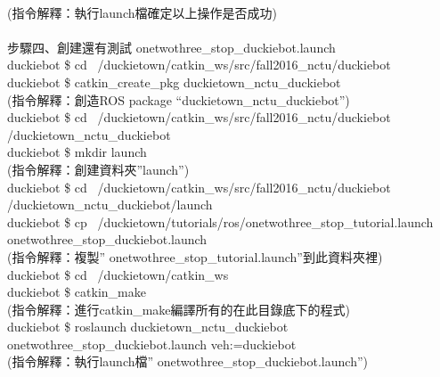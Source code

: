 \documentclass{article}
\begin{document}
\\(指令解釋：執行launch檔確定以上操作是否成功)
\\\\步驟四、創建還有測試 onetwothree\_stop\_duckiebot.launch	
\\duckiebot \$ cd ~/duckietown/catkin\_ws/src/fall2016\_nctu/duckiebot
\\duckiebot \$ catkin\_create\_pkg duckietown\_nctu\_duckiebot
\\(指令解釋：創造ROS package “duckietown\_nctu\_duckiebot”)
\\duckiebot \$ cd ~/duckietown/catkin\_ws/src/fall2016\_nctu/duckiebot /duckietown\_nctu\_duckiebot
\\duckiebot \$ mkdir launch
\\(指令解釋：創建資料夾”launch”)
\\duckiebot \$ cd ~/duckietown/catkin\_ws/src/fall2016\_nctu/duckiebot /duckietown\_nctu\_duckiebot/launch
\\duckiebot \$ cp ~/duckietown/tutorials/ros/onetwothree\_stop\_tutorial.launch onetwothree\_stop\_duckiebot.launch
\\(指令解釋：複製” onetwothree\_stop\_tutorial.launch”到此資料夾裡)
\\duckiebot \$ cd ~/duckietown/catkin\_ws
\\duckiebot \$ catkin\_make
\\(指令解釋：進行catkin\_make編譯所有的在此目錄底下的程式)
\\duckiebot \$ roslaunch duckietown\_nctu\_duckiebot onetwothree\_stop\_duckiebot.launch veh:=duckiebot
\\(指令解釋：執行launch檔” onetwothree\_stop\_duckiebot.launch”)
\end{document}
